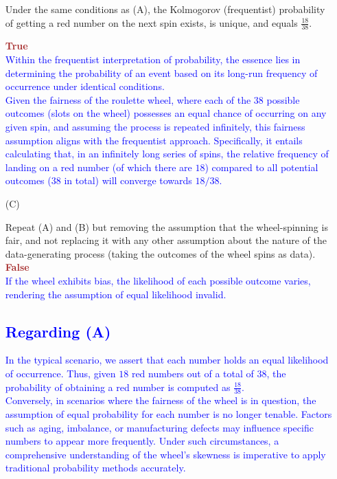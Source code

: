 \documentclass[12pt]{article}
\begin{document}
\begin{itemize}
Under the same conditions as (A), the Kolmogorov (frequentist) probability
of getting a red number on the next spin exists, is unique, and equals
$\frac{ 18 }{ 38 }$.

\textbf{\textcolor{brown}{True}} \\
\textcolor{blue}{Within the frequentist interpretation of probability, the essence lies in determining the probability of an event based on its long-run frequency of occurrence under identical conditions.\\
Given the fairness of the roulette wheel, where each of the \textcolor{blue}{\(38\)} possible outcomes (slots on the wheel) possesses an equal chance of occurring on any given spin, and assuming the process is repeated infinitely, this fairness assumption aligns with the frequentist approach. Specifically, it entails calculating that, in an infinitely long series of spins, the relative frequency of landing on a red number (of which there are \textcolor{blue}{\(18\)}) compared to all potential outcomes (\textcolor{blue}{\(38\)} in total) will converge towards \textcolor{blue}{\(18/38\)}.}

    
\item[(C)]

Repeat (A) and (B) but removing the assumption that the wheel-spinning is fair, and not replacing it with any other assumption about the nature of the data-generating process (taking the outcomes of the wheel spins as data). \\ 
    \textcolor{brown}{\textbf{False}}
    \\ \textcolor{blue}{If the wheel exhibits bias, the likelihood of each possible outcome varies, rendering the assumption of equal likelihood invalid.} 
\subsection*{\textcolor{blue}{\textbf{Regarding (A)}}}
\textcolor{blue}{
In the typical scenario, we assert that each number holds an equal likelihood of occurrence. Thus, given \textcolor{blue}{\(18\)} red numbers out of a total of \textcolor{blue}{\(38\)}, the probability of obtaining a red number is computed as \(\frac{18}{38}\).\\
Conversely, in scenarios where the fairness of the wheel is in question, the assumption of equal probability for each number is no longer tenable. Factors such as aging, imbalance, or manufacturing defects may influence specific numbers to appear more frequently. Under such circumstances, a comprehensive understanding of the wheel's skewness is imperative to apply traditional probability methods accurately.
} \\

\end{itemize}
\end{document}
